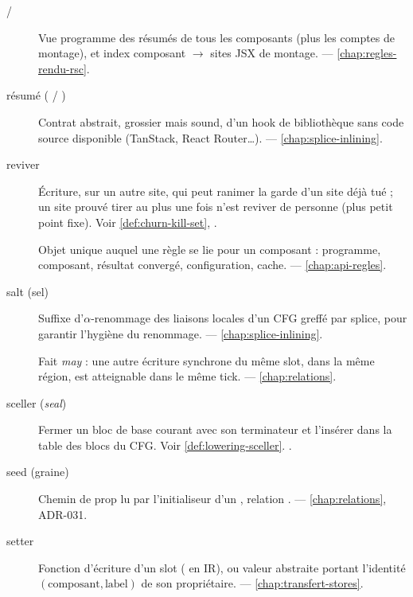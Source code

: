\begin{description}
\item[ / ] Vue programme des résumés  de tous les composants (plus les comptes de montage), et index composant \(\to\) sites JSX de montage.  — \cref{chap:regles-rendu-rsc}.

\item[résumé ( / )] Contrat abstrait, grossier mais sound, d'un hook de bibliothèque sans code source disponible (TanStack, React Router\ldots).  — \cref{chap:splice-inlining}.

\item[reviver] Écriture, sur un autre site, qui peut ranimer la garde d'un site déjà tué ; un site prouvé tirer au plus une fois n'est reviver de personne (plus petit point fixe). Voir \cref{def:churn-kill-set}, .

\item[] Objet unique auquel une règle se lie pour un composant : programme, composant, résultat convergé, configuration, cache.  — \cref{chap:api-regles}.

\item[salt (sel)] Suffixe  d'\(\alpha\)-renommage des liaisons locales d'un CFG greffé par splice, pour garantir l'hygiène du renommage.  — \cref{chap:splice-inlining}.

\item[] Fait \emph{may} : une autre écriture synchrone du même slot, dans la même région, est atteignable dans le même tick.  — \cref{chap:relations}.

\item[sceller (\emph{seal})] Fermer un bloc de base courant avec son terminateur et l'insérer dans la table des blocs du CFG. Voir \cref{def:lowering-sceller}. .

\item[seed (graine)] Chemin de prop lu par l'initialiseur d'un , relation .  — \cref{chap:relations}, ADR-031.

\item[setter] Fonction d'écriture d'un slot ( en IR), ou valeur abstraite  portant l'identité \((\text{composant}, \text{label})\) de son propriétaire.  — \cref{chap:transfert-stores}.


\end{description}
